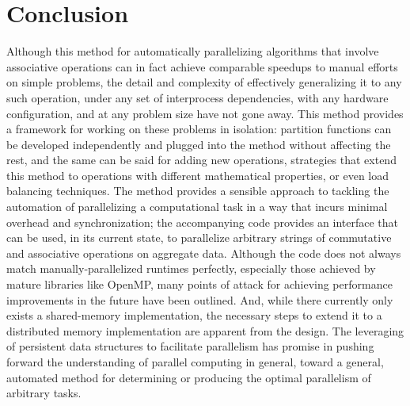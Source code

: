 \chapter{Conclusion}

Although this method for automatically parallelizing algorithms that involve
associative operations can in fact achieve comparable speedups to manual efforts
on simple problems, the detail and complexity of effectively generalizing it
to any such operation, under any set of interprocess dependencies, with any
hardware configuration, and at any problem size have not gone away. This method
provides a framework for working on these problems in isolation: partition
functions can be developed independently and plugged into the method without
affecting the rest, and the same can be said for adding new operations,
strategies that extend this method to operations with different mathematical
properties, or even load balancing techniques. The method provides a sensible
approach to tackling the automation of parallelizing a computational task in a
way that incurs minimal overhead and synchronization; the accompanying code
provides an interface that can be used, in its current state, to parallelize
arbitrary strings of commutative and associative operations on aggregate data.
Although the code does not always match manually-parallelized runtimes
perfectly, especially those achieved by mature libraries like OpenMP, many
points of attack for achieving performance improvements in the future have been
outlined. And, while there currently only exists a shared-memory implementation,
the necessary steps to extend it to a distributed memory implementation are
apparent from the design. The leveraging of persistent data structures to
facilitate parallelism has promise in pushing forward the understanding of
parallel computing in general, toward a general, automated method for
determining or producing the optimal parallelism of arbitrary tasks.

